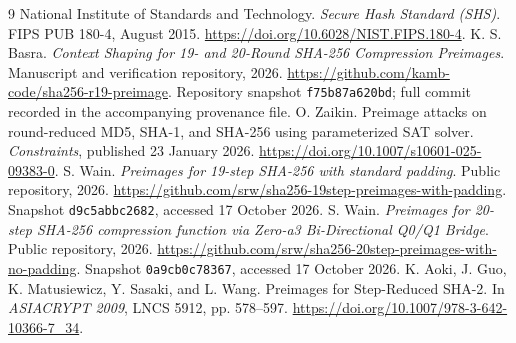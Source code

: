 \documentclass[11pt,a4paper]{article}
\newcommand{\hex}[1]{\texttt{#1}}
\begin{document}
\clearpage
\begin{thebibliography}{9}
 National Institute of Standards and Technology. \emph{Secure Hash Standard (SHS)}. FIPS PUB 180-4, August 2015. \url{https://doi.org/10.6028/NIST.FIPS.180-4}.
 K. S. Basra. \emph{Context Shaping for 19- and 20-Round SHA-256 Compression Preimages}. Manuscript and verification repository, 2026. \url{https://github.com/kamb-code/sha256-r19-preimage}. Repository snapshot \hex{f75b87a620bd}; full commit recorded in the accompanying provenance file.
 O. Zaikin. Preimage attacks on round-reduced MD5, SHA-1, and SHA-256 using parameterized SAT solver. \emph{Constraints}, published 23 January 2026. \url{https://doi.org/10.1007/s10601-025-09383-0}.
 S. Wain. \emph{Preimages for 19-step SHA-256 with standard padding}. Public repository, 2026. \url{https://github.com/srw/sha256-19step-preimages-with-padding}. Snapshot \hex{d9c5abbc2682}, accessed 17 October 2026.
 S. Wain. \emph{Preimages for 20-step SHA-256 compression function via Zero-a3 Bi-Directional Q0/Q1 Bridge}. Public repository, 2026. \url{https://github.com/srw/sha256-20step-preimages-with-no-padding}. Snapshot \hex{0a9cb0c78367}, accessed 17 October 2026.
 K. Aoki, J. Guo, K. Matusiewicz, Y. Sasaki, and L. Wang. Preimages for Step-Reduced SHA-2. In \emph{ASIACRYPT 2009}, LNCS 5912, pp. 578--597. \url{https://doi.org/10.1007/978-3-642-10366-7_34}.
\end{thebibliography}
\end{document}

